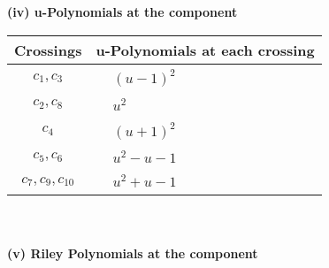 \documentclass[1p]{elsarticle_modified}
\theoremstyle{definition}
\begin{document}
\newpage\renewcommand{\arraystretch}{1}
\flushleft \textbf{(iv) u-Polynomials at the component}\newline \\
\begin{tabular}{m{50pt}|m{274pt}}
Crossings & \hspace{64pt}u-Polynomials at each crossing \\
\hline $$\begin{aligned}c_{1},c_{3}\end{aligned}$$&$\begin{aligned}
&(u-1)^2
\end{aligned}$\\
\hline $$\begin{aligned}c_{2},c_{8}\end{aligned}$$&$\begin{aligned}
&u^2
\end{aligned}$\\
\hline $$\begin{aligned}c_{4}\end{aligned}$$&$\begin{aligned}
&(u+1)^2
\end{aligned}$\\
\hline $$\begin{aligned}c_{5},c_{6}\end{aligned}$$&$\begin{aligned}
&u^2- u-1
\end{aligned}$\\
\hline $$\begin{aligned}c_{7},c_{9},c_{10}\end{aligned}$$&$\begin{aligned}
&u^2+u-1
\end{aligned}$\\
\hline
\end{tabular}\\~\\
\newpage\renewcommand{\arraystretch}{1}
\flushleft \textbf{(v) Riley Polynomials at the component}\newline \\
\end{document}

